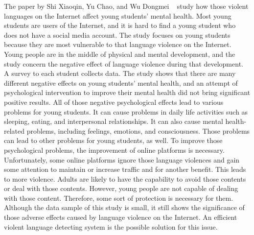\documentclass[12pt, natbib=false]{article}
\begin{document}
The paper by Shi Xiaoqin, Yu Chao, and Wu Dongmei ~\cite{shi2021influence} study how those violent languages on the Internet affect young students' mental health.
Most young students are users of the Internet, and it is hard to find a young student who does not have a social media account.
The study focuses on young students because they are most vulnerable to that language violence on the Internet.
Young people are in the middle of physical and mental development, and the study concern the negative effect of language violence during that development.
A survey to each student collects data. The study shows that there are many different negative effects on young students’ mental health, and an attempt of psychological intervention to improve their mental health did not bring significant positive results.
All of those negative psychological effects lead to various problems for young students.
It can cause problems in daily life activities such as sleeping, eating, and interpersonal relationships. It can also cause mental health-related problems, including feelings, emotions, and consciousness.
Those problems can lead to other problems for young students, as well. To improve those psychological problems, the improvement of online platforms is necessary.
Unfortunately, some online platforms ignore those language violences and gain some attention to maintain or increase traffic and for another benefit.
This leads to more violence. Adults are likely to have the capability to avoid those contents or deal with those contents.
However, young people are not capable of dealing with those content. Therefore, some sort of protection is necessary for them.
Although the data sample of this study is small, it still shows the significance of those adverse effects caused by language violence on the Internet.
An efficient violent language detecting system is the possible solution for this issue. 
\end{document}
